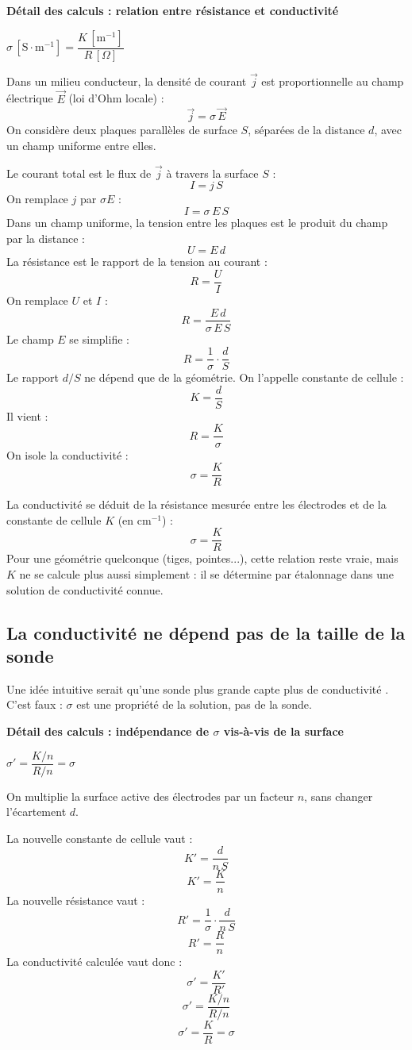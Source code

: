 \documentclass[11pt,a4paper]{article}
\newcommand{\resultat}[1]{\begin{center}{\large\color{bleuENO}$\displaystyle #1$}\end{center}}
\newenvironment{demo}[2]{\par\medskip\noindent\textbf{Détail des calculs : #1}\par\nopagebreak\resultat{#2}}{\par\medskip}
\begin{document}
\begin{demo}{relation entre résistance et conductivité}{\sigma\,[\mathrm{S \cdot m^{-1}}] = \dfrac{K\,[\mathrm{m^{-1}}]}{R\,[\Omega]}}
Dans un milieu conducteur, la densité de courant $\vec{j}$ est proportionnelle au champ électrique $\vec{E}$ (loi d'Ohm locale) :
\[
\vec{j} = \sigma \, \vec{E}
\]
On considère deux plaques parallèles de surface $S$, séparées de la distance $d$, avec un champ uniforme entre elles.

Le courant total est le flux de $\vec{j}$ à travers la surface $S$ :
\[
I = j \, S
\]
On remplace $j$ par $\sigma E$ :
\[
I = \sigma \, E \, S
\]
Dans un champ uniforme, la tension entre les plaques est le produit du champ par la distance :
\[
U = E \, d
\]
La résistance est le rapport de la tension au courant :
\[
R = \frac{U}{I}
\]
On remplace $U$ et $I$ :
\[
R = \frac{E \, d}{\sigma \, E \, S}
\]
Le champ $E$ se simplifie :
\[
R = \frac{1}{\sigma} \cdot \frac{d}{S}
\]
Le rapport $d/S$ ne dépend que de la géométrie. On l'appelle constante de cellule :
\[
K = \frac{d}{S}
\]
Il vient :
\[
R = \frac{K}{\sigma}
\]
On isole la conductivité :
\[
\sigma = \frac{K}{R}
\]
\end{demo}

\begin{retenir}
La conductivité se déduit de la résistance mesurée entre les électrodes et de la constante de cellule $K$ (en $\mathrm{cm^{-1}}$) :
\[
\sigma = \frac{K}{R}
\]
Pour une géométrie quelconque (tiges, pointes...), cette relation reste vraie, mais $K$ ne se calcule plus aussi simplement : il se détermine par étalonnage dans une solution de conductivité connue.
\end{retenir}

\subsection{La conductivité ne dépend pas de la taille de la sonde}

Une idée intuitive serait qu'une sonde plus grande \og capte plus de conductivité \fg. C'est faux : $\sigma$ est une propriété de la solution, pas de la sonde.

\begin{demo}{indépendance de $\sigma$ vis-à-vis de la surface}{\sigma' = \dfrac{K/n}{R/n} = \sigma}
On multiplie la surface active des électrodes par un facteur $n$, sans changer l'écartement $d$.

La nouvelle constante de cellule vaut :
\[
K' = \frac{d}{n \, S}
\]
\[
K' = \frac{K}{n}
\]
La nouvelle résistance vaut :
\[
R' = \frac{1}{\sigma} \cdot \frac{d}{n \, S}
\]
\[
R' = \frac{R}{n}
\]
La conductivité calculée vaut donc :
\[
\sigma' = \frac{K'}{R'}
\]
\[
\sigma' = \frac{K / n}{R / n}
\]
\[
\sigma' = \frac{K}{R} = \sigma
\]
\end{demo}
\end{document}

